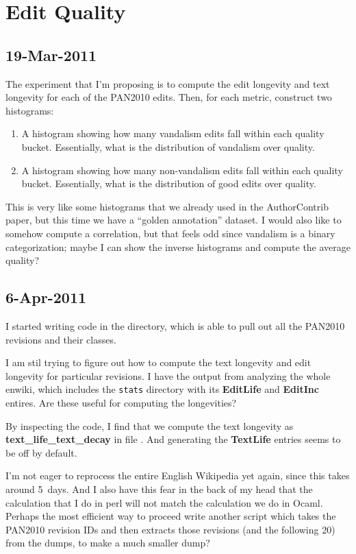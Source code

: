\section{Edit Quality}

\subsection{19-Mar-2011}

The experiment that I'm proposing is to compute the edit longevity
and text longevity for each of the PAN2010 edits.
Then, for each metric, construct two histograms:
\begin{enumerate}
\item A histogram showing how many vandalism edits fall within
    each quality bucket.  Essentially, what is the distribution
    of vandalism over quality.
\item A histogram showing how many non-vandalism edits fall within
    each quality bucket.  Essentially, what is the distribution
    of good edits over quality.
\end{enumerate}
This is very like some histograms that we already used in
the AuthorContrib paper, but this time we have a ``golden annotation''
dataset.
I would also like to somehow compute a correlation, but that
feels odd since vandalism is a binary categorization;
maybe I can show the inverse histograms and compute the
average quality?

\subsection{6-Apr-2011}

I started writing code in the  directory,
which is able to pull out all the PAN2010 revisions and their classes.

I am stil trying to figure out how to compute the text longevity
and edit longevity for particular revisions.
I have the output from analyzing the whole enwiki, which includes
the \texttt{stats} directory with its \textbf{EditLife}
and \textbf{EditInc} entires.
Are these useful for computing the longevities?

By inspecting the code, I find that we compute the text longevity
as \textbf{text\_life\_text\_decay} in file .
And generating the \textbf{TextLife} entries seems to be off by default.

I'm not eager to reprocess the entire English Wikipedia yet again,
since this takes around 5~days.
And I also have this fear in the back of my head that the calculation
that I do in perl will not match the calculation we do in Ocaml.
Perhaps the most efficient way to proceed write another script
which takes the PAN2010 revision IDs and then extracts those revisions
(and the following 20) from the dumps, to make a much smaller dump?


